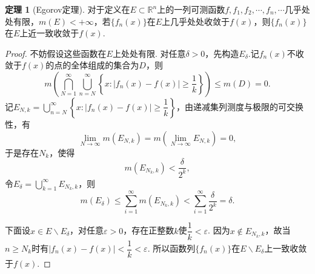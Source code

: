 \documentclass[12pt]{ctexart}
\theoremstyle{definition}
\newtheorem{theorem}{定理}
\theoremstyle{plain}
\begin{document}
	\begin{theorem}[Egorov定理]
		对于定义在$E\subset \mathbb{R}^n$上的一列可测函数$f,f_1,f_2,\cdots,f_n,\cdots$几乎处处有限，$m(E)<+\infty$，若$\{f_n(x)\}$在$E$上几乎处处收敛于$f(x)$，则$\{f_n(x)\}$在$E$上近一致收敛于$f(x)$.
	\end{theorem}
	\begin{proof}
		不妨假设这些函数在$E$上处处有限. 对任意$\delta>0$，先构造$E_{\delta}$.记$f_n(x)$不收敛于$f(x)$的点的全体组成的集合为$D$，则
		$$m\left(\bigcap_{N=1}^{\infty}\bigcup_{n=N}^{\infty}\left\{x:\left|f_n(x)-f(x)\right|\geqslant\frac{1}{k}\right\}\right)\leqslant m(D)=0.$$
		记$E_{N,k}=\displaystyle\bigcup_{n=N}^{\infty}\left\{x:\left|f_n(x)-f(x)\right|\geqslant\dfrac{1}{k}\right\}$，由递减集列测度与极限的可交换性，有
		$$\lim\limits_{N\to\infty}m(E_{N,k})=m\left(\lim\limits_{N\to\infty}E_{N,k}\right)=0,$$
		于是存在$N_k$，使得
		$$m(E_{N_k,k})<\frac{\delta}{2^k},$$
		令$E_{\delta}=\displaystyle\bigcup_{k=1}^{\infty}E_{N_k,k}$，则
		$$m(E_{\delta})\leqslant\sum_{i=1}^{\infty}m(E_{N_k,k})<\sum_{i=1}^{\infty}\frac{\delta}{2^k}=\delta.$$
		
		下面设$x\in E\backslash E_{\delta}$，对任意$\varepsilon>0$，存在正整数$k$使$\dfrac{1}{k}<\varepsilon$. 因为$x\notin E_{N_k,k}$，故当$n\geqslant N_k$时有$\left|f_n(x)-f(x)\right|<\dfrac{1}{k}<\varepsilon$. 所以函数列$\{f_n(x)\}$在$E\backslash E_{\delta}$上一致收敛于$f(x)$.
	\end{proof}
\end{document}
